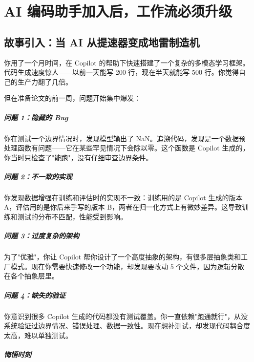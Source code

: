 \chapter{AI 编码助手加入后，工作流必须升级}
\label{ch:ai_workflow}

\section{故事引入：当 AI 从提速器变成地雷制造机}

你用了一个月时间，在 Copilot 的帮助下快速搭建了一个复杂的多模态学习框架。代码生成速度惊人——以前一天能写 200 行，现在半天就能写 500 行。你觉得自己的生产力翻了几倍。

但在准备论文的前一周，问题开始集中爆发：

\paragraph{问题 1：隐藏的 Bug}

你在测试一个边界情况时，发现模型输出了 NaN。追溯代码，发现是一个数据预处理函数有问题——它在某些罕见情况下会除以零。这个函数是 Copilot 生成的，你当时只检查了"能跑"，没有仔细审查边界条件。

\paragraph{问题 2：不一致的实现}

你发现数据增强在训练和评估时的实现不一致：训练用的是 Copilot 生成的版本 A，评估用的是你后来手写的版本 B，两者在归一化方式上有微妙差异。这导致训练和测试的分布不匹配，性能受到影响。

\paragraph{问题 3：过度复杂的架构}

为了"优雅"，你让 Copilot 帮你设计了一个高度抽象的架构，有很多层抽象类和工厂模式。现在你需要快速修改一个功能，却发现要改动 5 个文件，因为逻辑分散在各个抽象层里。

\paragraph{问题 4：缺失的验证}

你意识到很多 Copilot 生成的代码都没有测试覆盖。你一直依赖"跑通就行"，从没系统验证过边界情况、错误处理、数据一致性。现在想补测试，却发现代码耦合度太高，难以单独测试。

\paragraph{悔悟时刻}

